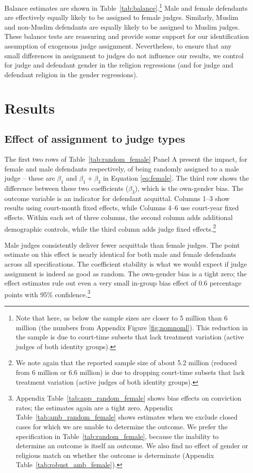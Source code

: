 \documentclass[12pt,english]{article}
\begin{document}
Balance estimates are shown in Table~\ref{tab:balance}.\footnote{Note that here, as below the sample sizes are closer to 5 million than 6 million (the numbers from Appendix Figure \ref{fig:nomnoml}). This reduction in the sample is due to court-time subsets that lack treatment variation (active judges of both identity groups).} Male and female defendants are effectively equally likely to be assigned to female judges. Similarly, Muslim and non-Muslim defendants are equally likely to be assigned to Muslim judges.  These balance tests are reassuring and provide some support for our identification assumption of exogenous judge assignment. Nevertheless, to ensure that any small differences in assignment to judges do not influence our results, we control for judge and defendant gender in the religion regressions (and for judge and defendant religion in the gender regressions).

\section{Results}
\label{sec:results}

\subsection{Effect of assignment to judge types}

The first two rows of Table~\ref{tab:random_female} Panel A present the impact, for female and male defendants respectively, of being randomly assigned to a male judge -- these are $\beta_1$ and $\beta_1+\beta_3$ in Equation \ref{eq:female}. The third row shows the difference between these two coefficients ($\beta_3$), which is the own-gender bias. The outcome variable is an indicator for defendant acquittal. Columns 1--3 show results using court-month fixed effects, while Columns 4--6 use court-year fixed effects. Within each set of three columns, the second column adds additional demographic controls, while the third column adds judge fixed effects.\footnote{We note again that the reported sample size of about 5.2 million (reduced from 6 million or 6.6 million) is due to dropping court-time subsets that lack treatment variation (active judges of both identity groups).}

Male judges consistently deliver fewer acquittals than female judges. The point estimate on this effect is nearly identical for both male and female defendants across all specifications. The coefficient stability is what we would expect if judge assignment is indeed as good as random. The own-gender bias is a tight zero; the effect estimates rule out even a very small in-group bias effect of 0.6 percentage points with 95\% confidence.\footnote{Appendix Table~\ref{tab:app_random_female} shows bias effects on conviction rates; the estimates again are a tight zero. Appendix Table~\ref{tab:amb_random_female} shows estimates when we exclude closed cases for which we are unable to determine the outcome. We prefer the specification in Table~\ref{tab:random_female}, because the inability to determine an outcome is itself an outcome. We also find no effect of gender or religious match on whether the outcome is determinate (Appendix Table~\ref{tab:robust_amb_female}).}
\end{document}
